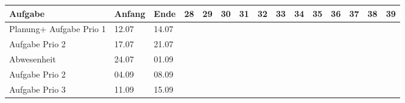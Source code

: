 \begin{landscape}
    
\begin{tabularx}{21cm}{|l|l|l|X|X|X|X|X|X|X|X|X|X|X|X|}
    \hline
    \textbf{Aufgabe}                       & \textbf{Anfang} & \textbf{Ende} & \textbf{28}            & \textbf{29}            & \textbf{30}            & \textbf{31}            & \textbf{32}            & \textbf{33}            & \textbf{34}            & \textbf{35}            & \textbf{36}            & \textbf{37}            & \textbf{38}            & \textbf{39}            \\ \hline
    Planung+ Aufgabe Prio 1                & 12.07           & 14.07         & \cellcolor[HTML]{34CDF9} &                          &                          &                          &                          &                          &                          &                          &                          &                          &                          &                          \\ \hline
    Aufgabe Prio 2                         & 17.07           & 21.07         &                          & \cellcolor[HTML]{34CDF9} &                          &                          &                          &                          &                          &                          &                          &                          &                          &                          \\ \hline
    Abwesenheit                            & 24.07           & 01.09         &                          &                          & \cellcolor[HTML]{C0C0C0} & \cellcolor[HTML]{C0C0C0} & \cellcolor[HTML]{C0C0C0} & \cellcolor[HTML]{C0C0C0} & \cellcolor[HTML]{C0C0C0} & \cellcolor[HTML]{C0C0C0} &                          &                          &                          &                          \\ \hline
    Aufgabe Prio 2                         & 04.09           & 08.09         &                          &                          &                          &                          &                          &                          &                          &                          & \cellcolor[HTML]{34CDF9} &                          &                          &                          \\ \hline
    Aufgabe Prio 3                         & 11.09           & 15.09         &                          &                          &                          &                          &                          &                          &                          &                          &                          & \cellcolor[HTML]{34CDF9} &                          &                          \\ \hline

\end{tabularx}
\end{landscape}
